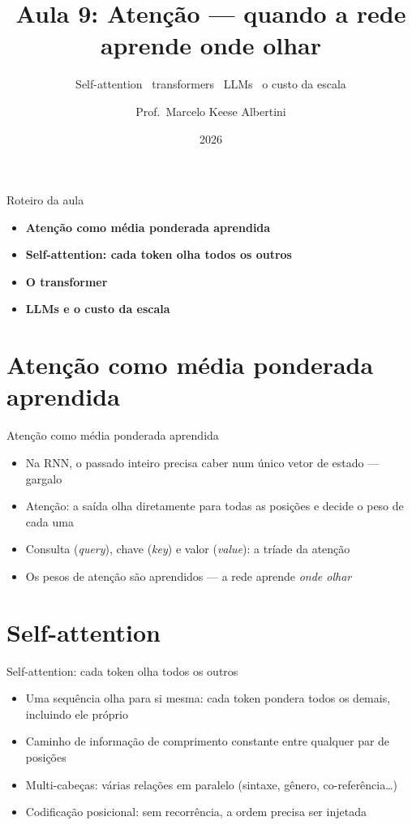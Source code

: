 \documentclass[aspectratio=169, 11pt]{beamer}
\title[Aula 9 — Atenção]{Aula 9: Atenção — quando a rede aprende onde olhar}
\subtitle[GBC073 — Inteligência Computacional]{Self-attention \textbullet\ transformers \textbullet\ LLMs \textbullet\ o custo da escala}
\author[Prof.\ Marcelo Albertini]{Prof.\ Marcelo Keese Albertini}
\institute{GBC073 — Inteligência Computacional \textbullet\ Universidade Federal de Uberlândia}
\date{2026}
\begin{document}
\begin{frame}
  \titlepage
\end{frame}

\begin{frame}{Roteiro da aula}
  \begin{itemize}\setlength{\itemsep}{0.5ex}
    \item<1-> \textbf{Atenção como média ponderada aprendida}
    \item<2-> \textbf{Self-attention: cada token olha todos os outros}
    \item<3-> \textbf{O transformer}
    \item<4-> \textbf{LLMs e o custo da escala}
  \end{itemize}
\end{frame}

\section{Atenção como média ponderada aprendida}

\begin{frame}{Atenção como média ponderada aprendida}
  \begin{itemize}\setlength{\itemsep}{0.4ex}
    \item Na RNN, o passado inteiro precisa caber num único vetor de estado —
          gargalo
    \item Atenção: a saída olha diretamente para todas as posições e decide
          o peso de cada uma
    \item Consulta (\emph{query}), chave (\emph{key}) e valor (\emph{value}):
          a tríade da atenção
    \item Os pesos de atenção são aprendidos — a rede aprende \emph{onde olhar}
  \end{itemize}
\end{frame}

\section{Self-attention}

\begin{frame}{Self-attention: cada token olha todos os outros}
  \begin{itemize}\setlength{\itemsep}{0.4ex}
    \item Uma sequência olha para si mesma: cada token pondera todos os
          demais, incluindo ele próprio
    \item Caminho de informação de comprimento constante entre qualquer par
          de posições
    \item Multi-cabeças: várias relações em paralelo (sintaxe, gênero,
          co-referência\ldots)
    \item Codificação posicional: sem recorrência, a ordem precisa ser
          injetada
  \end{itemize}
\end{frame}
\end{document}
